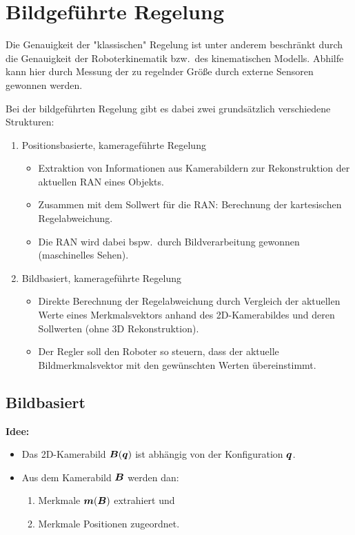 \documentclass[a4paper, 11pt, accentcolor = tud3b]{tudreport}
\makeatletter
\newcommand{\matnospacing}[1]{\boldsymbol{#1}}
\newcommand{\vecnospacing}[1]{\boldsymbol{#1}}
\newcommand{\mat}[1]{\matnospacing{#1} \ifthenelse{\equal{#1}{A} \OR \equal{#1}{n} \OR \equal{#1}{m} \OR \equal{#1}{B} \OR \equal{#1}{q} \OR \equal{#1}{F} \OR \equal{#1}{J}}{}{\@ifnextchar({}{\@ifnextchar[{}{\@ifnextchar\{{}{\@ifnextchar\,{}{\!}}}}}}
\renewcommand{\vec}[1]{\vecnospacing{#1} \ifthenelse{\equal{#1}{A} \OR \equal{#1}{n} \OR \equal{#1}{m} \OR \equal{#1}{B} \OR \equal{#1}{q} \OR \equal{#1}{F} \OR \equal{#1}{J}}{}{\@ifnextchar({}{\@ifnextchar[{}{\@ifnextchar\{{}{\@ifnextchar\,{}{\!}}}}}}
\newcommand{\bzw}{bzw.~}
\newcommand{\bspw}{bspw.~}
\makeatother
\begin{document}
		\section{Bildgeführte Regelung}
			Die Genauigkeit der "klassischen" Regelung ist unter anderem beschränkt durch die Genauigkeit der Roboterkinematik \bzw des kinematischen Modells. Abhilfe kann hier durch Messung der zu regelnder Größe durch externe Sensoren gewonnen werden.
			
			Bei der bildgeführten Regelung gibt es dabei zwei grundsätzlich verschiedene Strukturen:
			\begin{enumerate}
				\item Positionsbasierte, kamerageführte Regelung
					\begin{itemize}
						\item Extraktion von Informationen aus Kamerabildern zur Rekonstruktion der aktuellen RAN eines Objekts.
						\item Zusammen mit dem Sollwert für die RAN: Berechnung der kartesischen Regelabweichung.
						\item Die RAN wird dabei \bspw durch Bildverarbeitung gewonnen (maschinelles Sehen).
					\end{itemize}
				\item Bildbasiert, kamerageführte Regelung
					\begin{itemize}
						\item Direkte Berechnung der Regelabweichung durch Vergleich der aktuellen Werte eines Merkmalsvektors anhand des 2D-Kamerabildes und deren Sollwerten (ohne 3D Rekonstruktion).
						\item Der Regler soll den Roboter so steuern, dass der aktuelle Bildmerkmalsvektor mit den gewünschten Werten übereinstimmt.
					\end{itemize}
			\end{enumerate}

			\subsection{Bildbasiert}
				\textbf{Idee:}
				\begin{itemize}
					\item Das 2D-Kamerabild \( \mat{B}(\vec{q}) \) ist abhängig von der Konfiguration \( \vec{q} \).
					\item Aus dem Kamerabild \( \mat{B} \) werden dan:
						\begin{enumerate}
							\item Merkmale \( \vec{m}(\mat{B}) \) extrahiert und
							\item Merkmale Positionen zugeordnet.
						\end{enumerate}
				\end{itemize}
			
\end{document}
